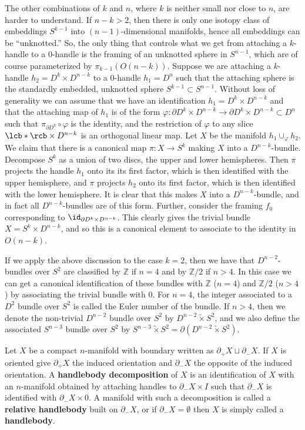 The other combinations of $k$ and $n$, where $k$ is neither small nor close to $n$, are harder to understand. If $n-k > 2$, then there is only one isotopy class of embeddings $S^{k-1}$ into $(n-1)$-dimensional manifolds, hence all embeddings can be ``unknotted.'' So, the only thing that controls what we get from attaching a $k$-handle to a $0$-handle is the framing of an unknotted sphere in $S^{n-1}$, which are of course parameterized by $\pi_{k-1}(O(n-k))$. Suppose we are attaching a $k$-handle $h_2 = D^k \times D^{n-k}$ to a $0$-handle $h_1 = D^n$ such that the attaching sphere is the standardly embedded, unknotted sphere $S^{k-1} \subset S^{n-1}$. Without loss of generality we can assume that we have an identification $h_1 = D^k \times D^{n-k}$ and that the attaching map of $h_1$ is of the form $\varphi : \partial D^k \times D^{n-k} \rightarrow \partial D^k \times D^{n-k} \subset D^n$ such that $\pi_{\partial D^k} \circ \varphi$ is the identity, and the restriction of $\varphi$ to any slice $\lcb * \rcb \times D^{n-k}$ is an orthogonal linear map. Let $X$ be the manifold $h_1 \cup_\varphi h_2$. We claim that there is a canonical map $\pi : X \rightarrow S^k$ making $X$ into a $D^{n-k}$-bundle. Decompose $S^k$ as a union of two discs, the upper and lower hemispheres. Then $\pi$ projects the handle $h_1$ onto its its first factor, which is then identified with the upper hemisphere, and $\pi$ projects $h_2$ onto its first factor, which is then identified with the lower hemisphere. It is clear that this makes $X$ into a $D^{n-k}$-bundle, and in fact all $D^{n-k}$-bundles are of this form. Further, consider the framing $f_0$ corresponding to $\id_{\partial D^k \times D^{n-k}}$. This clearly gives the trivial bundle $X = S^k \times D^{n-k}$, and so this is a canonical element to associate to the identity in $O(n-k)$.

If we apply the above discussion to the case $k=2$, then we have that $D^{n-2}$-bundles over $S^2$ are classified by $\mathbb Z$ if $n=4$ and by $\mathbb Z/2$ if $n>4$. In this case we can get a canonical identification of these bundles with $\mathbb Z$ ($n=4$) and $\mathbb Z/2$ ($n>4$) by associating the trivial bundle with 0. For $n=4$, the integer associated to a $D^2$ bundle over $S^2$ is called the Euler number of the bundle. If $n > 4$, then we denote the non-trivial $D^{n-2}$ bundle over $S^2$ by $D^{n-2} \tilde\times S^2$, and we also define the associated $S^{n-3}$ bundle over $S^2$ by $S^{n-3} \tilde\times S^2 = \partial (D^{n-2} \tilde\times S^2)$.


Let $X$ be a compact $n$-manifold with boundary written as $\partial_+ X \sqcup \partial_- X$. If $X$ is oriented give $\partial_+ X$ the induced orientation and $\partial_- X$ the opposite of the induced orientation. A \textbf{handlebody decomposition} of $X$ is an identification of $X$ with an $n$-manifold obtained by attaching handles to $\partial_- X \times I$ such that $\partial_- X$ is identified with $\partial_- X \times 0$. A manifold with such a decomposition is called a \textbf{relative handlebody} built on $\partial_- X$, or if $\partial_- X = \emptyset$ then $X$ is simply called a \textbf{handlebody}. 

